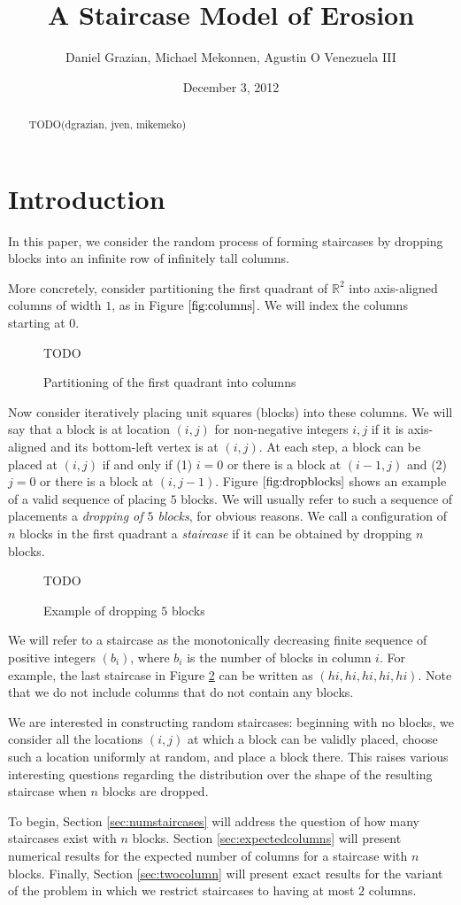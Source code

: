 \documentclass[12pt]{amsart}
\title{A Staircase Model of Erosion}
\author{Daniel Grazian, Michael Mekonnen, Agustin O Venezuela III}
\date{December 3, 2012}
\newcommand{\R}{\mathbb{R}}
\newcommand{\newfigure}[3]{
\begin{figure}
#3
\caption{#2 \label{#1}}
\end{figure}
}
\newcommand{\newsection}[2]{
\section{#1 \label{#2}}
}
\begin{document}
\begin{abstract}
TODO(dgrazian, jven, mikemeko)
\end{abstract}

\maketitle

\newsection{Introduction}{sec:intro}
In this paper, we consider the random process of forming staircases by dropping blocks into an infinite row of infinitely tall columns.

More concretely, consider partitioning the first quadrant of $\R^2$ into axis-aligned columns of width $1$, as in Figure $\ref{fig:columns}$. We will index the columns starting at $0$.

\newfigure{fig:columns}{Partitioning of the first quadrant into columns}{
TODO
}

Now consider iteratively placing unit squares (blocks) into these columns. We will say that a block is at location $(i, j)$ for non-negative integers $i, j$ if it is axis-aligned and its bottom-left vertex is at $(i, j)$. At each step, a block can be placed at $(i, j)$ if and only if (1) $i = 0$ or there is a block at $(i - 1, j)$ and (2) $j = 0$ or there is a block at $(i, j - 1)$. Figure $\ref{fig:dropblocks}$ shows an example of a valid sequence of placing $5$ blocks. We will usually refer to such a sequence of placements a \textit{dropping of $5$ blocks}, for obvious reasons. We call a configuration of $n$ blocks in the first quadrant a \textit{staircase} if it can be obtained by dropping $n$ blocks.

\newfigure{fig:dropblocks}{Example of dropping $5$ blocks}{
TODO
}

We will refer to a staircase as the monotonically decreasing finite sequence of positive integers $(b_i)$, where $b_i$ is the number of blocks in column $i$. For example, the last staircase in Figure \ref{fig:dropblocks} can be written as $(hi,hi,hi,hi,hi)$. Note that we do not include columns that do not contain any blocks.

We are interested in constructing random staircases: beginning with no blocks, we consider all the locations $(i, j)$ at which a block can be validly placed, choose such a location uniformly at random, and place a block there. This raises various interesting questions regarding the distribution over the shape of the resulting staircase when $n$ blocks are dropped.

To begin, Section \ref{sec:numstaircases} will address the question of how many staircases exist with $n$ blocks. Section \ref{sec:expectedcolumns} will present numerical results for the expected number of columns for a staircase with $n$ blocks. Finally, Section \ref{sec:twocolumn} will present exact results for the variant of the problem in which we restrict staircases to having at most $2$ columns.
\end{document}
